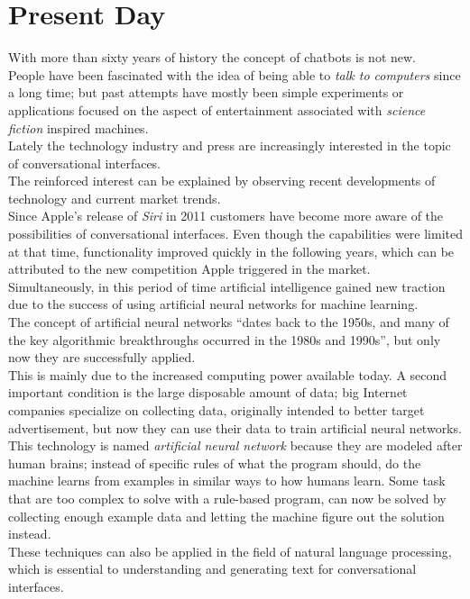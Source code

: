 \section{Present Day}
\label{presentday}


With more than sixty years of history the concept of chatbots is not new.
\\
People have been fascinated with the idea of being able to \emph{talk to computers} since a long time;
but past attempts have mostly been simple experiments or applications focused on the aspect of entertainment associated with \emph{science fiction} inspired machines.
\\

Lately the technology industry and press are increasingly interested in the topic of conversational interfaces.
\\
The reinforced interest can be explained by observing recent developments of technology and current market trends.
\\

Since Apple's release of \emph{Siri}\cite{iphonelaunch} in 2011 customers have become more aware of the possibilities of conversational interfaces.
Even though the capabilities were limited at that time,
functionality improved quickly in the following years,
which can be attributed to the new competition Apple triggered in the market.
\\

Simultaneously, in this period of time artificial intelligence gained new traction due to the success of using artificial neural networks for machine learning\cite{mltrend}.
\\
The concept of artificial neural networks ``dates back to the 1950s, and many of the key algorithmic breakthroughs occurred in the 1980s and 1990s''\cite{airevolution},
but only now they are successfully applied.
\\
This is mainly due to the increased computing power available today.
A second important condition is the large disposable amount of data;
big Internet companies specialize on collecting data, originally intended to better target advertisement,
but now they can use their data to train artificial neural networks.
\\
This technology is named \emph{artificial neural network} because they are modeled after human brains;
instead of specific rules of what the program should, do the machine learns from examples in similar ways to how humans learn.
Some task that are too complex to solve with a rule-based program, can now be solved by collecting enough example data
and letting the machine figure out the solution instead.
\\
These techniques can also be applied in the field of natural language processing,
which is essential to understanding and generating text for conversational interfaces.
\\

